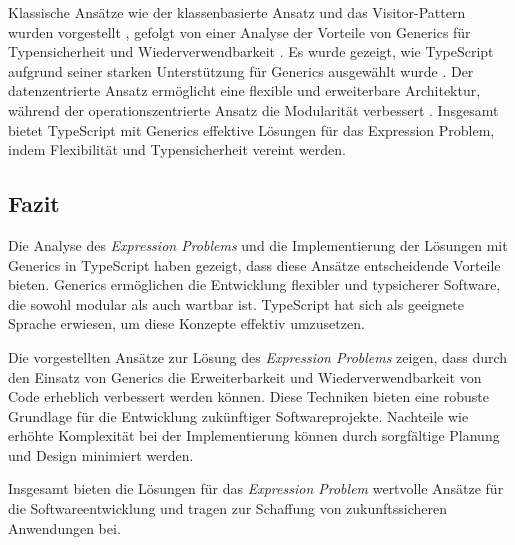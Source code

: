 \documentclass{easychair}
\begin{document}
  Klassische Ansätze wie der klassenbasierte Ansatz und das Visitor-Pattern wurden vorgestellt \cite{gamma1994design}, gefolgt von einer Analyse der Vorteile von Generics für Typensicherheit und Wiederverwendbarkeit \cite{rozentals2019typescript}. Es wurde gezeigt, wie TypeScript aufgrund seiner starken Unterstützung für Generics ausgewählt wurde \cite{typescript2019deepdive}. Der datenzentrierte Ansatz ermöglicht eine flexible und erweiterbare Architektur, während der operationszentrierte Ansatz die Modularität verbessert \cite{torgersen2004expression}. Insgesamt bietet TypeScript mit Generics effektive Lösungen für das Expression Problem, indem Flexibilität und Typensicherheit vereint werden.


  \subsection{Fazit}

  Die Analyse des \textit{Expression Problems} und die Implementierung der Lösungen mit Generics in TypeScript haben gezeigt, dass diese Ansätze entscheidende Vorteile bieten. Generics ermöglichen die Entwicklung flexibler und typsicherer Software, die sowohl modular als auch wartbar ist. TypeScript hat sich als geeignete Sprache erwiesen, um diese Konzepte effektiv umzusetzen.
  
  Die vorgestellten Ansätze zur Lösung des \textit{Expression Problems} zeigen, dass durch den Einsatz von Generics die Erweiterbarkeit und Wiederverwendbarkeit von Code erheblich verbessert werden können. Diese Techniken bieten eine robuste Grundlage für die Entwicklung zukünftiger Softwareprojekte. Nachteile wie erhöhte Komplexität bei der Implementierung können durch sorgfältige Planung und Design minimiert werden.
  
  Insgesamt bieten die Lösungen für das \textit{Expression Problem} wertvolle Ansätze für die Softwareentwicklung und tragen zur Schaffung von zukunftssicheren Anwendungen bei.
  
 \newpage
\label{sect:bib}

%
%
%

\end{document}
